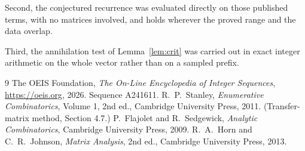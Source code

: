 \documentclass[11pt,a4paper]{article}
\theoremstyle{plain}
\theoremstyle{definition}
\begin{document}
Second, the conjectured recurrence was evaluated directly on those published terms, with no
matrices involved, and holds wherever the proved range and the data overlap.

Third, the annihilation test of Lemma~\ref{lem:crit} was carried out in exact integer
arithmetic on the whole vector rather than on a sampled prefix.

\begin{thebibliography}{9}
 The OEIS Foundation, \emph{The On-Line Encyclopedia of Integer
Sequences}, \url{https://oeis.org}, 2026. Sequence A241611.
 R.~P.~Stanley, \emph{Enumerative Combinatorics}, Volume 1, 2nd ed.,
Cambridge University Press, 2011. (Transfer-matrix method, Section 4.7.)
 P.~Flajolet and R.~Sedgewick, \emph{Analytic Combinatorics}, Cambridge
University Press, 2009.
 R.~A.~Horn and C.~R.~Johnson, \emph{Matrix Analysis}, 2nd ed., Cambridge
University Press, 2013.
\end{thebibliography}
\end{document}
